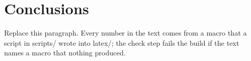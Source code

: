 \section{Conclusions}

Replace this paragraph. Every number in the text comes from a macro that a script in scripts/ wrote into latex/;
the check step fails the build if the text names a macro that nothing produced.
